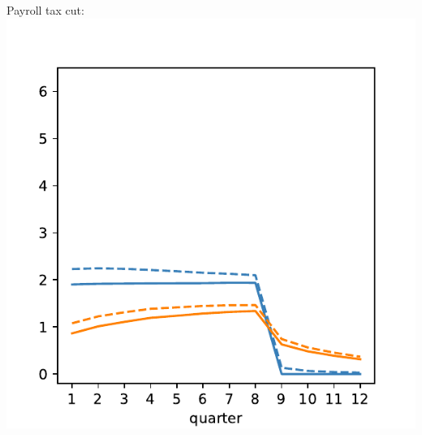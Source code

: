 \documentclass[pdflatex,aspectratio=169]{beamer}
\begin{document}
{\begin{frame}
\begin{columns}
      \begin{column}{0.50\textwidth}
        Payroll tax cut:
        \includegraphics[width=1.2\linewidth]{Code/HA-Models/FromPandemicCode/Figures/recession_taxcut_relrecession}
      \end{column}
    \end{columns}

  \end{frame}

}{}
\end{document}
